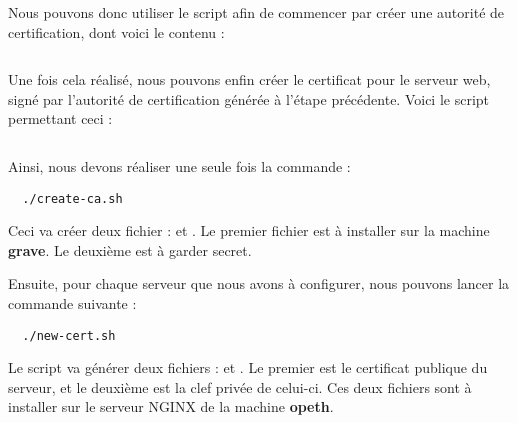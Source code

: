 Nous pouvons donc utiliser le script  afin de commencer par créer une autorité de certification, dont voici le contenu :

\inputminted[bgcolor=lbcolor, breaklines]{shell}{../CA/create-ca.sh}

Une fois cela réalisé, nous pouvons enfin créer le certificat pour le serveur web, signé par l'autorité de certification générée à l'étape précédente. Voici le script permettant ceci :

\inputminted[bgcolor=lbcolor, breaklines]{shell}{../CA/new-cert.sh}

Ainsi, nous devons réaliser une seule fois la commande :

\begin{verbatim}
  ./create-ca.sh
\end{verbatim}

Ceci va créer deux fichier :  et . Le premier fichier est à installer sur la machine \textbf{grave}. Le deuxième est à garder secret.

Ensuite, pour chaque serveur que nous avons à configurer, nous pouvons lancer la commande suivante :

\begin{verbatim}
  ./new-cert.sh
\end{verbatim}

Le script va générer deux fichiers :  et . Le premier est le certificat publique du serveur, et le deuxième est la clef privée de celui-ci. Ces deux fichiers sont à installer sur le serveur NGINX de la machine \textbf{opeth}.
